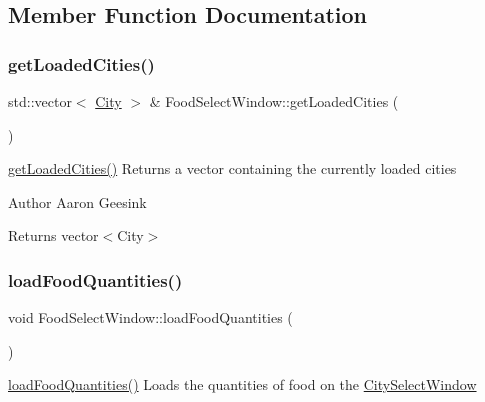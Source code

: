 \subsection{Member Function Documentation}
\mbox{\label{class_food_select_window_a2a32ba559351db37a46af24cad9cba5d}} 
\subsubsection{\texorpdfstring{getLoadedCities()}{getLoadedCities()}}
{\footnotesize\ttfamily std\+::vector$<$ \mbox{\hyperlink{class_city}{City}} $>$ \& Food\+Select\+Window\+::get\+Loaded\+Cities (\begin{DoxyParamCaption}{ }\end{DoxyParamCaption})}



\mbox{\hyperlink{class_food_select_window_a2a32ba559351db37a46af24cad9cba5d}{get\+Loaded\+Cities()}} Returns a vector containing the currently loaded cities 

\begin{DoxyAuthor}{Author}
Aaron Geesink 
\end{DoxyAuthor}
\begin{DoxyReturn}{Returns}
vector$<$\+City$>$ 
\end{DoxyReturn}
\mbox{\label{class_food_select_window_a608403f9ed5796c1a1d0ac034296bc05}} 
\subsubsection{\texorpdfstring{loadFoodQuantities()}{loadFoodQuantities()}}
{\footnotesize\ttfamily void Food\+Select\+Window\+::load\+Food\+Quantities (\begin{DoxyParamCaption}{ }\end{DoxyParamCaption})}



\mbox{\hyperlink{class_food_select_window_a608403f9ed5796c1a1d0ac034296bc05}{load\+Food\+Quantities()}} Loads the quantities of food on the \mbox{\hyperlink{class_city_select_window}{City\+Select\+Window}} 

